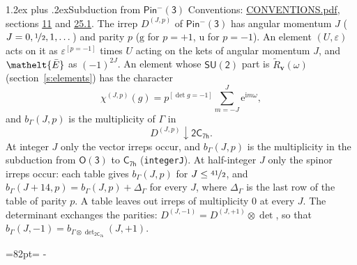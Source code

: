 \documentclass[10pt,a4paper]{article}
\makeatletter
\renewcommand\section{\@startsection{section}{1}{\z@}{-3ex plus -1ex minus -.2ex}%
  {1.2ex plus .2ex}{\normalfont\large\sffamily\bfseries\color{parttitle}}}
\newcommand{\needspace}[1]{\par\penalty-100\begingroup\dimen0=#1\relax\dimen2=\pagegoal
  \advance\dimen2-\pagetotal\ifdim\dimen0>\dimen2\relax\ifdim\dimen2>0pt\vfil\break\fi\fi
  \endgroup}
\numberwithin{equation}{section}
\newcommand{\eltfont}[1]{{\let\sigma\eltsigma\mathelt{#1}}}
\newcommand{\grp}[1]{\mathsf{#1}}
\newcommand{\elt}[1]{\eltfont{#1}}
\newcommand{\ptag}[1]{\mathrm{#1}}
\newcommand{\iverson}[1]{[#1]}
\newcommand{\restr}[2]{#1\!\downarrow#2}
\newcommand{\vv}{\mathbf{v}}
\newcommand{\iunit}{\mathrm{i}}
\newcommand{\expe}{\mathrm{e}}
\newcommand{\irrJp}[2]{D^{(#1,#2)}}
\newcommand{\irrprod}{\otimes}
\newcommand{\barred}[1]{\bar{#1}}
\newcommand{\lift}[1]{\tilde{#1}}
\makeatother
\begin{document}
\section{Subduction from \texorpdfstring{$\grp{Pin^{-}(3)}$}{Pin(3)}}\label{s:subduction_parent}
Conventions: \href{../../CONVENTIONS.pdf}{CONVENTIONS.pdf}, sections \href{../../../rotation/CONVENTIONS.pdf\#conv.11}{11} and \href{../../CONVENTIONS.pdf\#conv.25.1}{25.1}.
\leavevmode\label{n:index.J}\label{n:index.parity}\label{n:irrep.o3}The irrep $\irrJp{J}{p}$ of \href{Pinminus3.pdf}{$\grp{Pin^{-}(3)}$} has angular momentum $J$ ($J = 0, \nicefrac{1}{2}, 1, \dots$) and parity $p$ ($\ptag{g}$ for $p = +1$, $\ptag{u}$ for $p = -1$). An element $(U, \varepsilon)$ acts on it as $\varepsilon^{[p = -1]}$ times $U$ acting on the kets of angular momentum $J$, and $\elt{\barred{E}}$ as $(-1)^{2J}$. \label{n:function.character.parent}\label{n:function.multiplicity}An element whose $\grp{SU(2)}$ part is $\lift{R}_{\vv}(\omega)$ (section~\ref{s:elements}) has the character
\begin{equation}\label{e:chi}\chi^{(J,p)}(g) = p^{\iverson{\det g = -1}}\sum_{m=-J}^{J} \expe^{\iunit m\omega},\end{equation}
and $b_\Gamma(J, p)$ is the multiplicity of $\Gamma$ in
\begin{equation}\label{e:parent}\restr{\irrJp{J}{p}}{\grp{2C_{7h}}}.\end{equation}
At integer $J$ only the vector irreps occur, and $b_\Gamma(J, p)$ is the multiplicity in the subduction from $\grp{O(3)}$ to \href{../../../rotation/data/pdf/C7h.pdf}{$\grp{C_{7h}}$} (\texttt{integerJ}). \label{n:index.increment}At half-integer $J$ only the spinor irreps occur: each table gives $b_\Gamma(J, p)$ for $J \le \nicefrac{41}{2}$, and $b_\Gamma(J + 14, p) = b_\Gamma(J, p) + \Delta_\Gamma$ for every $J$, where $\Delta_\Gamma$ is the last row of the table of parity $p$. A table leaves out irreps of multiplicity 0 at every $J$.
\leavevmode\label{n:operator.determinant.character}The determinant exchanges the parities: $\irrJp{J}{-1} = \irrJp{J}{+1} \irrprod \det$, so that $b_\Gamma(J, -1) = b_{\Gamma \irrprod \det_{\grp{2C_{7h}}}}(J, +1)$.
\needspace{82pt}
\end{document}
